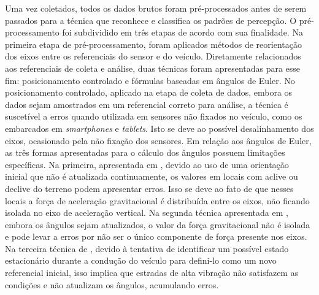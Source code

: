 Uma vez coletados, todos os dados brutos foram pré-processados antes de serem passados para a técnica que reconhece e classifica os padrões de percepção. O pré-processamento foi subdividido em três etapas de acordo com sua finalidade. Na primeira etapa de pré-processamento, foram aplicados métodos de reorientação dos eixos entre os referenciais do sensor e do veículo. Diretamente relacionados aos referenciais de coleta e análise, duas técnicas foram apresentadas para esse fim: posicionamento controlado e fórmulas baseadas em ângulos de Euler. No posicionamento controlado, aplicado na etapa de coleta de dados, embora os dados sejam amostrados em um referencial correto para análise, a técnica é suscetível a erros quando utilizada em sensores não fixados no veículo, como os embarcados em \textit{smartphones} e \textit{tablets}. Isto se deve ao possível desalinhamento dos eixos, ocasionado pela não fixação dos sensores. Em relação aos ângulos de Euler, as três formas apresentadas para o cálculo dos ângulos possuem limitações específicas. Na primeira, apresentada em , devido ao uso de uma orientação inicial que não é atualizada continuamente, os valores em locais com aclive ou declive do terreno podem apresentar erros. Isso se deve ao fato de que nesses locais a força de aceleração gravitacional é distribuída entre os eixos, não ficando isolada no eixo de aceleração vertical. Na segunda técnica apresentada em , embora os ângulos sejam atualizados, o valor da força gravitacional não é isolada e pode levar a erros por não ser o único componente de força presente nos eixos. Na terceira técnica de , devido à tentativa de identificar um possível estado estacionário durante a condução do veículo para defini-lo como um novo referencial inicial, isso implica que estradas de alta vibração não satisfazem as condições e não atualizam os ângulos, acumulando erros.

